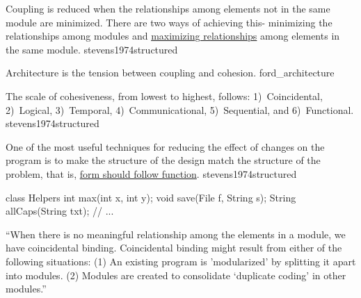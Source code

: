 \documentclass{article}
\begin{document}

  {Coupling is reduced when the relationships among elements not in the same module are minimized. There are two ways of achieving this- minimizing the relationships among modules and \ul{maximizing relationships} among elements in the same module.}
  {stevens1974structured}



  {Architecture is the tension between coupling and cohesion.}
  {ford_architecture}

  {The scale of cohesiveness, from lowest to highest, follows:
    1)~Coincidental,
    2)~Logical,
    3)~Temporal,
    4)~Communicational,
    5)~Sequential,
    and
    6)~Functional.}
  {stevens1974structured}


  {One of the most useful techniques for reducing the effect of changes on the program is to make the structure of the design match the structure of the problem, that is, \ul{form should follow function}.}
  {stevens1974structured}

\begin{multicols}{2}
{\small\begin{ffcode}
class Helpers {
  int max(int x, int y);
  void save(File f, String s);
  String allCaps(String txt);
  // ...
}
\end{ffcode}
}
\par\columnbreak\par
``When there is no meaningful relationship among the elements in a module, we have coincidental binding. Coincidental binding
might result from either of the following situations: (1) An existing program is 'modularized' by splitting it apart into modules. (2) Modules are created to consolidate `duplicate coding' in other modules.''
\end{multicols}
\plush{}
\end{document}
